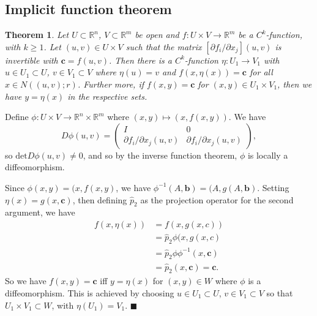 \documentclass[letter-paper]{tufte-book}
\newtheorem{theorem}{\color{pastel-blue}Theorem}[section]
\newenvironment{proof}[1][Proof]{\begin{trivlist}
\item[\hskip \labelsep {\bfseries #1}]}{\end{trivlist}}
\newcommand{\qed}{\hfill$\blacksquare$}
\begin{document}

\subsection{Implicit function theorem}

\begin{theorem}
  Let $U\subset \mathbb{R}^n$, $V \subset \mathbb{R}^m$ be open and $f : U
  \times V \to \mathbb{R}^m$ be a $C^k$-function, with $k \geq 1$. Let $(u, v)
  \in U \times V$ such that the matrix $[\partial f_i / \partial x_j](u, v)$ is
  invertible with $\boldsymbol{c} = f(u, v)$. Then there is a $C^k$-function
  $\eta : U_1 \to V_1$ with $u \in U_1 \subset U$, $v \in V_1 \subset V$ where
  $\eta(u) = v$ and $f(x, \eta(x)) = \boldsymbol{c}$ for all $x \in N( (u, v);
  r)$. Further more, if $f(x, y) = \boldsymbol{c}$ for $(x, y) \in U_1 \times
  V_1$, then we have $y = \eta(x)$ in the respective sets.
\end{theorem}

\begin{proof}
  Define $\phi : U \times V \to \mathbb{R}^n \times \mathbb{R}^m$ where $(x, y)
  \mapsto (x, f(x, y))$. We have
  \begin{equation*}
    D\phi(u, v) = \begin{pmatrix}I & 0 \\ \partial f_i/\partial x_j (u, v) & \partial f_i / \partial x_j (u, v) \end{pmatrix},
  \end{equation*}
  so $\mbox{det} D\phi(u, v) \neq 0$, and so by the inverse function theorem,
  $\phi$ is locally a diffeomorphism.
  
  Since $\phi(x, y) = (x, f(x, y)$, we have $\phi^{-1}(A, \boldsymbol{b}) = (A,
  g(A, \boldsymbol{b})$. Setting $\eta(x) = g(x, \boldsymbol{c})$, then defining
  $\hat{p}_2$ as the projection operator for the second argument, we have
  \begin{align*}
    f(x, \eta(x)) &= f(x, g(x, c)) \\
      &= \hat{p}_2 \phi(x, g(x, c) \\
      &= \hat{p}_2 \phi \phi^{-1} (x, \boldsymbol{c}) \\
      &= \hat{p}_2(x, \boldsymbol{c}) = \boldsymbol{c}.
  \end{align*}
  So we have $f(x, y) = \boldsymbol{c}$ iff $y = \eta(x)$ for $(x, y) \in W$
  where $\phi$ is a diffeomorphism. This is achieved by choosing $u \in U_1
  \subset U$, $v \in V_1 \subset V$ so that $U_1 \times V_1 \subset W$, with
  $\eta(U_1) = V_1$. \qed
\end{proof}
\end{document}
